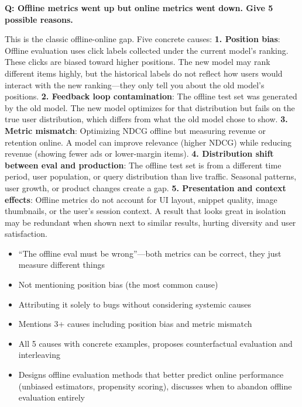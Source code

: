 \begin{interviewq}
\textbf{Q: Offline metrics went up but online metrics went down. Give 5 possible reasons.}

 \quad {} \quad \badgefreq{\freqhigh}

\stronganswer This is the classic offline-online gap. Five concrete causes: \textbf{1. Position bias}: Offline evaluation uses click labels collected under the current model's ranking. These clicks are biased toward higher positions. The new model may rank different items highly, but the historical labels do not reflect how users would interact with the new ranking---they only tell you about the old model's positions. \textbf{2. Feedback loop contamination}: The offline test set was generated by the old model. The new model optimizes for that distribution but fails on the true user distribution, which differs from what the old model chose to show. \textbf{3. Metric mismatch}: Optimizing NDCG offline but measuring revenue or retention online. A model can improve relevance (higher NDCG) while reducing revenue (showing fewer ads or lower-margin items). \textbf{4. Distribution shift between eval and production}: The offline test set is from a different time period, user population, or query distribution than live traffic. Seasonal patterns, user growth, or product changes create a gap. \textbf{5. Presentation and context effects}: Offline metrics do not account for UI layout, snippet quality, image thumbnails, or the user's session context. A result that looks great in isolation may be redundant when shown next to similar results, hurting diversity and user satisfaction.

\redflags
\begin{itemize}
    \item ``The offline eval must be wrong''---both metrics can be correct, they just measure different things
    \item Not mentioning position bias (the most common cause)
    \item Attributing it solely to bugs without considering systemic causes
\end{itemize}


\goodgreat
\begin{itemize}
    \item {} Mentions 3+ causes including position bias and metric mismatch
    \item {} All 5 causes with concrete examples, proposes counterfactual evaluation and interleaving
    \item {} Designs offline evaluation methods that better predict online performance (unbiased estimators, propensity scoring), discusses when to abandon offline evaluation entirely
\end{itemize}


\end{interviewq}
